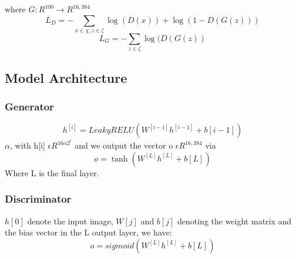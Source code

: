 \documentclass[conference]{IEEEtran}
\begin{document}
where \begin{math}G : R^{100} \longrightarrow R^{16,384}\end{math}
\begin{equation}
L_D = - \sum_{x \in \chi, z \in \zeta} \log(D(x)) + \log(1 - D(G(z))) \tag{6}
\end{equation}
\begin{equation}
L_G = - \sum_{z \in \zeta} \log(D(G(z)) \tag{7}
\end{equation}

\subsection{Model Architecture}

\subsubsection{Generator}

\begin{equation}
h^{[i]} = LeakyRELU(W^{[i-1]}h^{[i-1]}+b{[i-1]})\label{Gen LeakyRELU}
\end{equation}
\begin{math}\alpha \end{math}, with h[i] \begin{math}\epsilon R^{16\alpha2^i}\end{math} and we output the vector o \begin{math}\epsilon R^{16,384}\end{math} via
\begin{equation}
o =\tanh(W^{[L]}h^{[L]}+b{[L]})
\end{equation}
Where L is the final layer.

\subsubsection{Discriminator}
\begin{math}h[0]\end{math} denote the input
image, \begin{math}W [j]\end{math} and \begin{math}b[j]\end{math} denoting the weight matrix and the bias vector in the L output layer, we have:
\begin{equation}
o = sigmoid(W^{[L]}h^{[L]}+b{[L]})
\end{equation}
\end{document}
